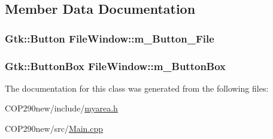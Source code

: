 \subsection{Member Data Documentation}
\subsubsection[{\texorpdfstring{m\+\_\+\+Button\+\_\+\+File}{m_Button_File}}]{\setlength{\rightskip}{0pt plus 5cm}Gtk\+::\+Button File\+Window\+::m\+\_\+\+Button\+\_\+\+File\hspace{0.3cm}{\ttfamily [protected]}}\hypertarget{class_file_window_acf6526bcbac19ea8e0295b3601f78f05}{}\label{class_file_window_acf6526bcbac19ea8e0295b3601f78f05}
\subsubsection[{\texorpdfstring{m\+\_\+\+Button\+Box}{m_ButtonBox}}]{\setlength{\rightskip}{0pt plus 5cm}Gtk\+::\+Button\+Box File\+Window\+::m\+\_\+\+Button\+Box\hspace{0.3cm}{\ttfamily [protected]}}\hypertarget{class_file_window_afa6c56d7516fb2a8cbee798ef298b646}{}\label{class_file_window_afa6c56d7516fb2a8cbee798ef298b646}


The documentation for this class was generated from the following files\+:\begin{DoxyCompactItemize}
\item 
C\+O\+P290new/include/\hyperlink{myarea_8h}{myarea.\+h}\item 
C\+O\+P290new/src/\hyperlink{_main_8cpp}{Main.\+cpp}\end{DoxyCompactItemize}
